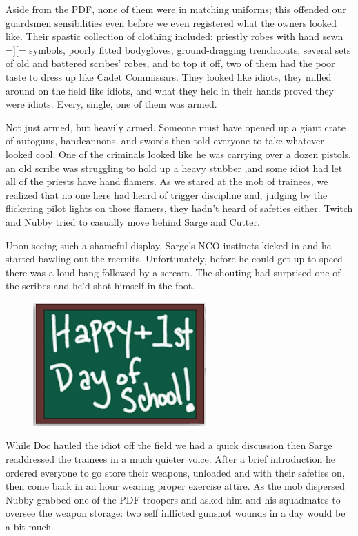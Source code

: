 Aside from the PDF, none of them were in matching uniforms; 
this offended our guardsmen sensibilities even before we even registered what the owners looked like. 
Their spastic collection of clothing included: 
priestly robes with hand sewn =][= symbols, poorly fitted bodygloves, ground-dragging trenchcoats, several sets of old and battered scribes’ robes, and to top it off, two of them had the poor taste to dress up like Cadet Commissars. 
They looked like idiots, they milled around on the field like idiots, and what they held in their hands proved they were idiots. 
Every, single, one of them was armed.

Not just armed, but heavily armed. 
Someone must have opened up a giant crate of autoguns, handcannons, and swords then told everyone to take whatever looked cool. 
One of the criminals looked like he was carrying over a dozen pistols, an old scribe was struggling to hold up a heavy stubber ,and some idiot had let all of the priests have hand flamers. 
As we stared at the mob of trainees, we realized that no one here had heard of trigger discipline and, judging by the flickering pilot lights on those flamers, they hadn’t heard of safeties either. 
Twitch and Nubby tried to casually move behind Sarge and Cutter.

Upon seeing such a shameful display, Sarge’s NCO instincts kicked in and he started bawling out the recruits. 
Unfortunately, before he could get up to speed there was a loud bang followed by a scream. 
The shouting had surprised one of the scribes and he’d shot himself in the foot.

\begin{figure}
	\begin{center}
		\includegraphics[width=\figwidth]{pics/8/10.png}
	\end{center}
\end{figure}
While Doc hauled the idiot off the field we had a quick discussion then Sarge readdressed the trainees in a much quieter voice. 
After a brief introduction he ordered everyone to go store their weapons, unloaded and with their safeties on, then come back in an hour wearing proper exercise attire. 
As the mob dispersed Nubby grabbed one of the PDF troopers and asked him and his squadmates to oversee the weapon storage: 
two self inflicted gunshot wounds in a day would be a bit much.


